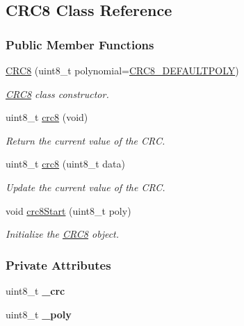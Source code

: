 \hypertarget{class_c_r_c8}{}\subsection{C\+R\+C8 Class Reference}
\label{class_c_r_c8}
\subsubsection*{Public Member Functions}
\begin{DoxyCompactItemize}
\item 
\mbox{\hyperlink{class_c_r_c8_aa55fad578b29297298f72e65b2494fdb}{C\+R\+C8}} (uint8\+\_\+t polynomial=\mbox{\hyperlink{_crc8_8h_a723f9adea4dfa42b246b0d248e57a794}{C\+R\+C8\+\_\+\+D\+E\+F\+A\+U\+L\+T\+P\+O\+LY}})
\begin{DoxyCompactList}\small\item\em \mbox{\hyperlink{class_c_r_c8}{C\+R\+C8}} class constructor. \end{DoxyCompactList}\item 
uint8\+\_\+t \mbox{\hyperlink{class_c_r_c8_a03f58a9f90db0e1d22fc48ba486a3654}{crc8}} (void)
\begin{DoxyCompactList}\small\item\em Return the current value of the C\+RC. \end{DoxyCompactList}\item 
uint8\+\_\+t \mbox{\hyperlink{class_c_r_c8_a80f09a2c108b6b2ba0fcfed3e6f9544b}{crc8}} (uint8\+\_\+t data)
\begin{DoxyCompactList}\small\item\em Update the current value of the C\+RC. \end{DoxyCompactList}\item 
void \mbox{\hyperlink{class_c_r_c8_a38931d0b9e5ba8f2e974dca7dbf30e5a}{crc8\+Start}} (uint8\+\_\+t poly)
\begin{DoxyCompactList}\small\item\em Initialize the \mbox{\hyperlink{class_c_r_c8}{C\+R\+C8}} object. \end{DoxyCompactList}\end{DoxyCompactItemize}
\subsubsection*{Private Attributes}
\begin{DoxyCompactItemize}
\item 
\mbox{\label{class_c_r_c8_ad196e3d62b2681cd6a816caa6d8bd367}} 
uint8\+\_\+t {\bfseries \+\_\+crc}
\item 
\mbox{\label{class_c_r_c8_a460b39f317bfe37f3db601e90debf3d8}} 
uint8\+\_\+t {\bfseries \+\_\+poly}
\end{DoxyCompactItemize}


